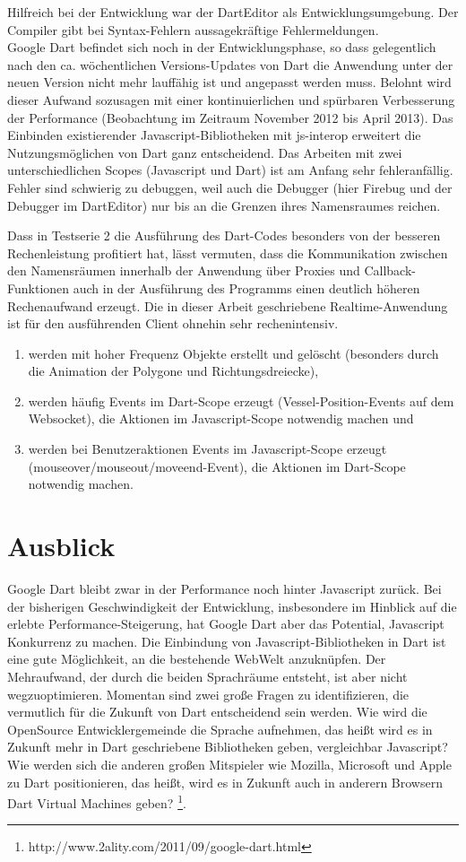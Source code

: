Hilfreich bei der Entwicklung war der DartEditor als Entwicklungsumgebung. Der Compiler gibt bei Syntax-Fehlern aussagekräftige Fehlermeldungen.\\  
Google Dart befindet sich noch in der Entwicklungsphase, so dass gelegentlich nach den ca. wöchentlichen Versions-Updates von Dart die Anwendung unter der neuen Version nicht mehr lauffähig ist und angepasst werden muss. Belohnt wird dieser Aufwand sozusagen mit einer kontinuierlichen und spürbaren Verbesserung der Performance (Beobachtung im Zeitraum November 2012 bis April 2013).
Das Einbinden existierender Javascript-Bibliotheken mit js-interop erweitert die Nutzungsmöglichen von Dart ganz entscheidend. Das Arbeiten mit zwei unterschiedlichen Scopes (Javascript und Dart) ist am Anfang sehr fehleranfällig. Fehler sind schwierig zu debuggen, weil auch die Debugger (hier Firebug und der Debugger im DartEditor) nur bis an die Grenzen ihres Namensraumes reichen.

Dass in Testserie 2 die Ausführung des Dart-Codes besonders von der besseren Rechenleistung profitiert hat, lässt vermuten, dass die Kommunikation zwischen den Namensräumen innerhalb der Anwendung über Proxies und Callback-Funktionen auch in der Ausführung des Programms einen deutlich höheren Rechenaufwand erzeugt.
Die in dieser Arbeit geschriebene Realtime-Anwendung ist für den ausführenden Client ohnehin sehr rechenintensiv.
\begin{enumerate}
\item werden mit hoher Frequenz Objekte erstellt und gelöscht (besonders durch die Animation der Polygone und Richtungsdreiecke), 
\item werden häufig Events im Dart-Scope erzeugt (Vessel-Position-Events auf dem Websocket), die Aktionen im Javascript-Scope notwendig machen und
\item werden bei Benutzeraktionen Events im Javascript-Scope erzeugt (mouseover/mouseout/moveend-Event), die Aktionen im Dart-Scope notwendig machen.
\end{enumerate}
\section{Ausblick}

Google Dart bleibt zwar in der Performance noch hinter Javascript zurück. Bei der bisherigen Geschwindigkeit der Entwicklung, insbesondere im Hinblick auf die erlebte Performance-Steigerung, hat Google Dart aber das Potential, Javascript Konkurrenz zu machen.
Die Einbindung von Javascript-Bibliotheken in Dart ist eine gute Möglichkeit, an die bestehende WebWelt anzuknüpfen. Der Mehraufwand, der durch die beiden Sprachräume entsteht, ist aber nicht wegzuoptimieren.
Momentan sind zwei große Fragen zu identifizieren, die vermutlich für die Zukunft von Dart entscheidend sein werden.
Wie wird die OpenSource Entwicklergemeinde die Sprache aufnehmen, das heißt wird es in Zukunft mehr in Dart geschriebene Bibliotheken geben, vergleichbar Javascript? 
\\
Wie werden sich die anderen großen Mitspieler wie Mozilla, Microsoft und Apple zu Dart positionieren, das heißt, wird es in Zukunft auch in anderern Browsern Dart Virtual Machines geben? \footnote{http://www.2ality.com/2011/09/google-dart.html}.


